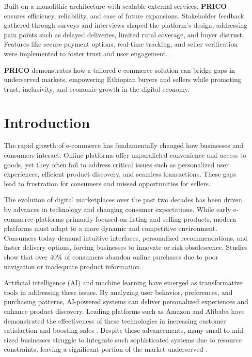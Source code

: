 \documentclass[12pt]{report}
\begin{document}
Built on a monolithic architecture with scalable external services, \textbf{PRICO}
ensures efficiency, reliability, and ease of future expansions. Stakeholder
feedback gathered through surveys and interviews shaped the platform’s
design, addressing pain points such as delayed deliveries, limited rural
coverage, and buyer distrust. Features like secure payment options,
real-time tracking, and seller verification were implemented to foster
trust and user engagement.

\textbf{PRICO} demonstrates how a tailored e-commerce solution can bridge gaps in
underserved markets, empowering Ethiopian buyers and sellers while
promoting trust, inclusivity, and economic growth in the digital economy.

\clearpage
{}

\newpage

\chapter{Introduction}
The rapid growth of e-commerce has fundamentally changed how businesses and consumers
interact. Online platforms offer unparalleled convenience and access to goods, yet they often
fail to address critical issues such as personalized user experiences, efficient product
discovery, and seamless transactions. These gaps lead to frustration for consumers and missed
opportunities for sellers.

The evolution of digital marketplaces over the past two decades has been driven by advances
in technology and changing consumer expectations. While early e-commerce platforms
primarily focused on listing and selling products, modern platforms must adapt to a more
dynamic and competitive environment. Consumers today demand intuitive interfaces,
personalized recommendations, and faster delivery options, forcing businesses to innovate or
risk obsolescence. Studies show that over 40\% of consumers abandon online purchases due to
poor navigation or inadequate product information\cite{c1}\cite{c2}.

Artificial intelligence (AI) and machine learning have emerged as transformative tools in
addressing these issues. By analyzing user behavior, preferences, and purchasing patterns,
AI-powered systems can deliver personalized experiences and enhance product discovery.
Leading platforms such as Amazon and Alibaba have demonstrated the effectiveness of these
technologies in increasing customer satisfaction and boosting sales \cite{c2}\cite{c3}. Despite these
advancements, many small to mid-sized businesses struggle to integrate such sophisticated
systems due to resource constraints, leaving a significant portion of the market underserved
\cite{c3}.
\end{document}
